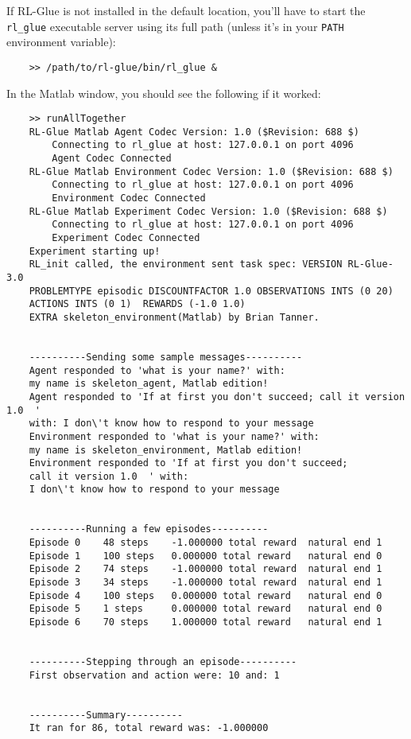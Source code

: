 \documentclass[11pt]{article}
\begin{document}
If RL-Glue is not installed in the default location, you'll have to start the \texttt{rl\_glue} executable server using its full path (unless it's in your \texttt{PATH} environment variable):
\begin{verbatim}
	>> /path/to/rl-glue/bin/rl_glue &
\end{verbatim}

In the Matlab window, you should see the following if it worked:
\begin{verbatim}
	>> runAllTogether
	RL-Glue Matlab Agent Codec Version: 1.0 ($Revision: 688 $)
		Connecting to rl_glue at host: 127.0.0.1 on port 4096
		Agent Codec Connected
	RL-Glue Matlab Environment Codec Version: 1.0 ($Revision: 688 $)
		Connecting to rl_glue at host: 127.0.0.1 on port 4096
		Environment Codec Connected
	RL-Glue Matlab Experiment Codec Version: 1.0 ($Revision: 688 $)
		Connecting to rl_glue at host: 127.0.0.1 on port 4096
		Experiment Codec Connected
	Experiment starting up!
	RL_init called, the environment sent task spec: VERSION RL-Glue-3.0 
	PROBLEMTYPE episodic DISCOUNTFACTOR 1.0 OBSERVATIONS INTS (0 20)  
	ACTIONS INTS (0 1)  REWARDS (-1.0 1.0)  
	EXTRA skeleton_environment(Matlab) by Brian Tanner.


	----------Sending some sample messages----------
	Agent responded to 'what is your name?' with: 
	my name is skeleton_agent, Matlab edition!
	Agent responded to 'If at first you don't succeed; call it version 1.0  ' 
	with: I don\'t know how to respond to your message
	Environment responded to 'what is your name?' with: 
	my name is skeleton_environment, Matlab edition!
	Environment responded to 'If at first you don't succeed; 
	call it version 1.0  ' with: 
	I don\'t know how to respond to your message


	----------Running a few episodes----------
	Episode 0	 48 steps 	 -1.000000 total reward	 natural end 1
	Episode 1	 100 steps 	 0.000000 total reward	 natural end 0
	Episode 2	 74 steps 	 -1.000000 total reward	 natural end 1
	Episode 3	 34 steps 	 -1.000000 total reward	 natural end 1
	Episode 4	 100 steps 	 0.000000 total reward	 natural end 0
	Episode 5	 1 steps 	 0.000000 total reward	 natural end 0
	Episode 6	 70 steps 	 1.000000 total reward	 natural end 1


	----------Stepping through an episode----------
	First observation and action were: 10 and: 1


	----------Summary----------
	It ran for 86, total reward was: -1.000000
\end{verbatim}
\end{document}
